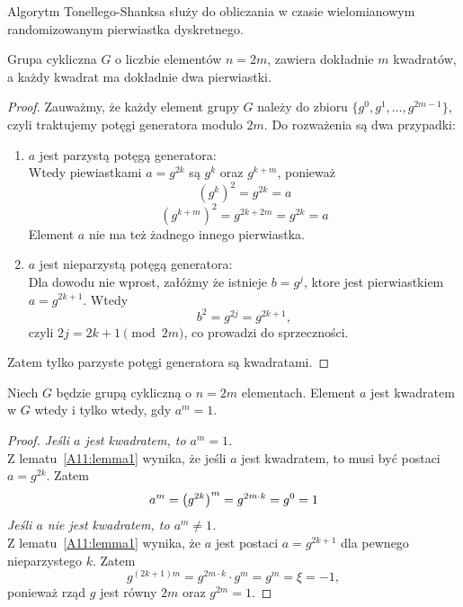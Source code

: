 Algorytm Tonellego-Shanksa służy do obliczania w czasie wielomianowym randomizowanym pierwiastka dyskretnego.

\begin{lemma}\label{A11:lemma1}
    Grupa cykliczna \( G \) o liczbie elementów \(n = 2m \), zawiera dokładnie \( m \) kwadratów, a każdy kwadrat ma dokładnie dwa pierwiastki.
\end{lemma}
\begin{proof}
    Zauważmy, że każdy element grupy \( G \) należy do zbioru \( \{g^0, g^1, \dots, g^{2m-1}\} \), czyli traktujemy potęgi generatora modulo \( 2m \). Do rozważenia są dwa przypadki:
    \begin{enumerate}
        \item \( a \) jest parzystą potęgą generatora: \\
        Wtedy piewiastkami \( a = g^{2k} \) są \( g^k \) oraz \( g^{k+m} \), ponieważ
        \[
            (g^k)^2 = g^{2k} = a
        \]
        \[
            (g^{k+m})^2 = g^{2k+2m} = g^{2k} = a
        \]
        Element \( a \) nie ma też żadnego innego pierwiastka.
        \item \( a \) jest nieparzystą potęgą generatora: \\
        Dla dowodu nie wprost, załóżmy że istnieje \( b = g^j \), ktore jest pierwiastkiem \( a = g^{2k+1} \). Wtedy
        \[
            b^2 = g^{2j} = g^{2k + 1},
        \]
        czyli \( 2j = 2k + 1 \pmod{2m} \), co prowadzi do sprzeczności.
    \end{enumerate}
    Zatem tylko parzyste potęgi generatora są kwadratami.
\end{proof}

\begin{lemma}\label{A11:lemma2}
    Niech \( G \) będzie grupą cykliczną o \( n = 2m \) elementach. Element \( a \) jest kwadratem w \( G \) wtedy i tylko wtedy, gdy \( a^m = 1 \).
\end{lemma}
\begin{proof}
    \textit{Jeśli \( a \) jest kwadratem, to \( a^m = 1\).} \\
    Z lematu~\ref{A11:lemma1} wynika, że jeśli \( a \) jest kwadratem, to musi być postaci \( a = g^{2k} \). Zatem
    \[
        a^m = \left(g^{2k}\right)^m = g^{2m \cdot k} = g^0 = 1
    \]
    \textit{Jeśli \( a \) nie jest kwadratem, to \( a^m \neq 1\).} \\
    Z lematu~\ref{A11:lemma1} wynika, że \( a \) jest postaci \( a = g^{2k+1} \) dla pewnego nieparzystego \( k \). Zatem
    \[
        g^{(2k+1)m} = g^{2m \cdot k} \cdot g^m = g^m = \xi = -1,
    \]
    ponieważ rząd \( g \) jest równy \( 2m \) oraz \( g^{2m} = 1 \).
\end{proof}

